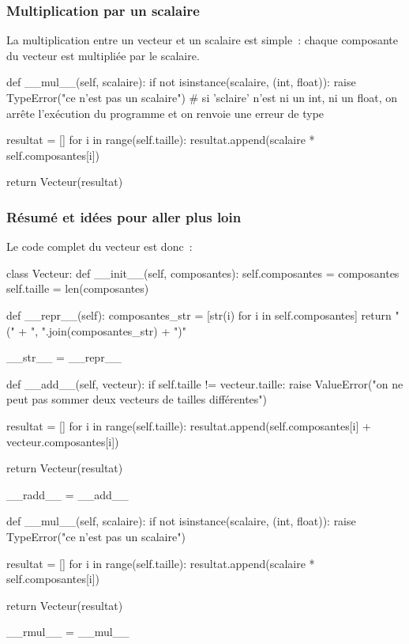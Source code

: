 		\subsubsection{Multiplication par un scalaire}
		La multiplication entre un vecteur et un scalaire est simple~: chaque composante du vecteur est multipliée par le scalaire.
		\begin{pythoncode}
			def __mul__(self, scalaire):
				if not isinstance(scalaire, (int, float)):
					raise TypeError("ce n'est pas un scalaire") # si 'sclaire' n'est ni un int, ni un float, on arrête l'exécution du programme et on renvoie une erreur de type
				
				resultat = []
				for i in range(self.taille):
					resultat.append(scalaire * self.composantes[i])
				
				return Vecteur(resultat)
		\end{pythoncode}
		
		\subsubsection{Résumé et idées pour aller plus loin}
		Le code complet du vecteur est donc~:
		\begin{pythoncode}
			class Vecteur:
				def __init__(self, composantes):
					self.composantes = composantes
					self.taille = len(composantes)
					
				def __repr__(self):
					composantes_str = [str(i) for i in self.composantes]
					return "(" + ", ".join(composantes_str) + ")"
								
				__str__ = __repr__
				
				def __add__(self, vecteur):
					if self.taille != vecteur.taille:
						raise ValueError("on ne peut pas sommer deux vecteurs de tailles différentes")
					
					resultat = []
					for i in range(self.taille):
						resultat.append(self.composantes[i] + vecteur.composantes[i])
					
					return Vecteur(resultat)
				
				__radd__ = __add__
					
				def __mul__(self, scalaire):
					if not isinstance(scalaire, (int, float)):
						raise TypeError("ce n'est pas un scalaire")
					
					resultat = []
					for i in range(self.taille):
						resultat.append(scalaire * self.composantes[i])
					
					return Vecteur(resultat)
				
				__rmul__ = __mul__
		\end{pythoncode}
		
